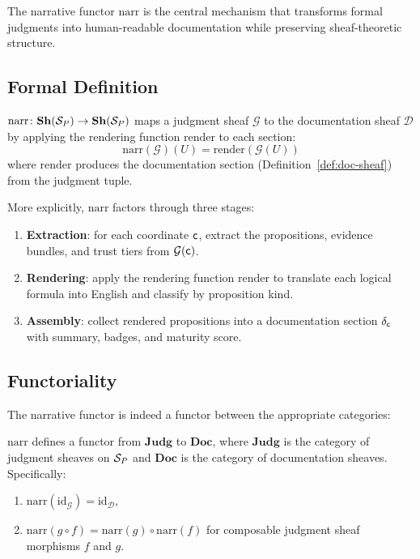 \documentclass[11pt]{article}
\newcommand{\DocSheaf}{\mathcal{D}}
\newcommand{\DocSection}{\delta}
\newcommand{\NarrFunc}{\mathrm{narr}}
\newcommand{\RenderFunc}{\mathrm{render}}
\newcommand{\DocCat}{\mathbf{Doc}}                    %
\newcommand{\JudgCat}{\mathbf{Judg}}                  %
\begin{document}
The narrative functor $\NarrFunc$ is the central mechanism that
transforms formal judgments into human-readable documentation while
preserving sheaf-theoretic structure.

\subsection{Formal Definition}

\begin{definition}\label{def:narr-func}
$\NarrFunc \colon \mathbf{Sh}(\Site_P) \to \mathbf{Sh}(\Site_P)$ maps
a judgment sheaf $\mathcal{G}$ to the documentation sheaf $\DocSheaf$
by applying the rendering function $\RenderFunc$ to each section:
\[
  \NarrFunc(\mathcal{G})(U) = \RenderFunc(\mathcal{G}(U))
\]
where $\RenderFunc$ produces the documentation section
(Definition~\ref{def:doc-sheaf}) from the judgment tuple.
\end{definition}

More explicitly, $\NarrFunc$ factors through three stages:
\begin{enumerate}[noitemsep]
\item \textbf{Extraction}: for each coordinate $\mathsf{c}$, extract the
  propositions, evidence bundles, and trust tiers from $\mathcal{G}(\mathsf{c})$.
\item \textbf{Rendering}: apply the rendering function $\RenderFunc$
  to translate each logical formula into English and classify by
  proposition kind.
\item \textbf{Assembly}: collect rendered propositions into a
  documentation section $\DocSection_{\coord}$ with summary, badges,
  and maturity score.
\end{enumerate}

\subsection{Functoriality}
The narrative functor is indeed a functor between the appropriate
categories:

\begin{proposition}[Functoriality of $\NarrFunc$]\label{prop:narr-functor}
$\NarrFunc$ defines a functor from $\JudgCat$ to $\DocCat$, where
$\JudgCat$ is the category of judgment sheaves on $\mathcal{S}_P$ and
$\DocCat$ is the category of documentation sheaves.  Specifically:
\begin{enumerate}[noitemsep]
\item $\NarrFunc(\mathrm{id}_{\mathcal{G}}) = \mathrm{id}_{\DocSheaf}$,
\item $\NarrFunc(g \circ f) = \NarrFunc(g) \circ \NarrFunc(f)$
  for composable judgment sheaf morphisms $f$ and $g$.
\end{enumerate}
\end{proposition}
\end{document}
